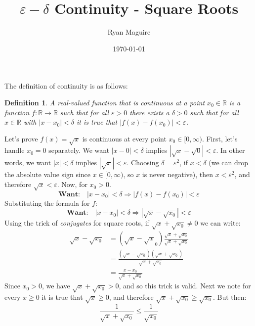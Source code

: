 \documentclass{article}
\title{$\varepsilon-\delta$ Continuity - Square Roots}
\author{Ryan Maguire}
\date{\today}
\theoremstyle{normal}
\newtheorem{definition}{Definition}
\theoremstyle{plain}
\begin{document}
    \maketitle
    The definition of continuity is as follows:
    \begin{definition}
        A real-valued function that is continuous at a point
        $x_{0}\in\mathbb{R}$ is a function $f:\mathbb{R}\rightarrow\mathbb{R}$
        such that for all $\varepsilon>0$ there exists a $\delta>0$ such that
        for all $x\in\mathbb{R}$ with $|x-x_{0}|<\delta$ it is true that
        $|f(x)-f(x_{0})|<\varepsilon$.
    \end{definition}
    Let's prove $f(x)=\sqrt{x}$ is continuous at every point
    $x_{0}\in[0,\infty)$. First, let's handle $x_{0}=0$ separately. We want
    $|x-0|<\delta$ implies $|\sqrt{x}-\sqrt{0}|<\varepsilon$. In other
    words, we want $|x|<\delta$ implies $|\sqrt{x}|<\varepsilon$. Choosing
    $\delta=\varepsilon^{2}$, if $x<\delta$ (we can drop the absolute value
    sign since $x\in[0,\infty)$, so $x$ is never negative), then
    $x<\varepsilon^{2}$, and therefore $\sqrt{x}<\varepsilon$. Now, for
    $x_{0}>0$.
    \begin{equation}
        \textbf{Want:}\quad
        |x-x_{0}|<\delta\Rightarrow
        |f(x)-f(x_{0})|<\varepsilon
    \end{equation}
    Substituting the formula for $f$:
    \begin{equation}
        \textbf{Want:}\quad
        |x-x_{0}|<\delta\Rightarrow
        |\sqrt{x}-\sqrt{x_{0}}|<\varepsilon
    \end{equation}
    Using the trick of \textit{conjugates} for square roots, if
    $\sqrt{x}+\sqrt{x_{0}}\ne{0}$ we can write:
    \begin{align}
        \sqrt{x}-\sqrt{x_{0}}
        &=(\sqrt{x}-\sqrt{x}_{0})
            \frac{\sqrt{x}+\sqrt{x_{0}}}{\sqrt{x}+\sqrt{x_{0}}}\\
        &=\frac{(\sqrt{x}-\sqrt{x_{0}})(\sqrt{x}+\sqrt{x_{0}})}
              {\sqrt{x}+\sqrt{x_{0}}}\\
        &=\frac{x-x_{0}}{\sqrt{x}+\sqrt{x_{0}}}
    \end{align}
    Since $x_{0}>0$, we have $\sqrt{x}+\sqrt{x_{0}}>0$, and so this
    trick is valid. Next we note for every $x\geq{0}$ it is true that
    $\sqrt{x}\geq{0}$, and therefore $\sqrt{x}+\sqrt{x_{0}}\geq\sqrt{x_{0}}$.
    But then:
    \begin{equation}
        \frac{1}{\sqrt{x}+\sqrt{x_{0}}}\leq\frac{1}{\sqrt{x_{0}}}
    \end{equation}
\end{document}
